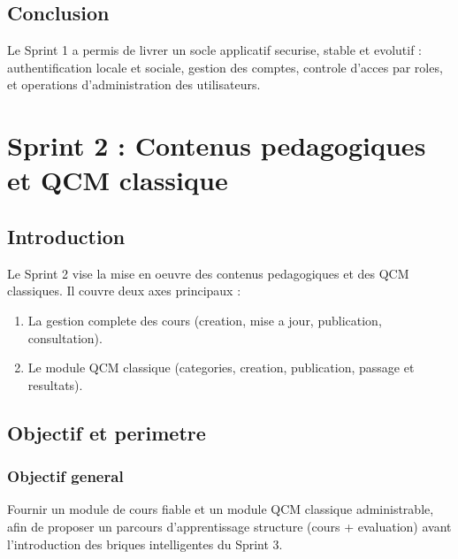 \documentclass[a4paper,12pt]{report}
\begin{document}
\section*{Conclusion}

Le Sprint 1 a permis de livrer un socle applicatif securise, stable et evolutif :
authentification locale et sociale, gestion des comptes, controle d'acces par roles,
et operations d'administration des utilisateurs.

\clearpage

\chapter{Sprint 2 : Contenus pedagogiques et QCM classique}
\minitoc
\newpage

\section*{Introduction}

Le Sprint 2 vise la mise en oeuvre des contenus pedagogiques et des QCM classiques.
Il couvre deux axes principaux :

\begin{enumerate}
  \item La gestion complete des cours (creation, mise a jour, publication, consultation).
  \item Le module QCM classique (categories, creation, publication, passage et resultats).
\end{enumerate}

\section{Objectif et perimetre}

\subsection{Objectif general}

Fournir un module de cours fiable et un module QCM classique administrable, afin
de proposer un parcours d'apprentissage structure (cours + evaluation) avant
l'introduction des briques intelligentes du Sprint 3.
\end{document}

